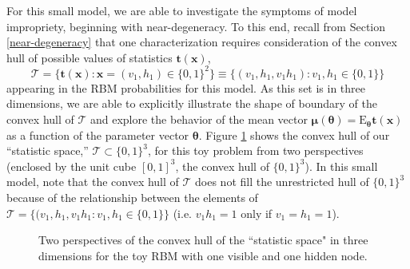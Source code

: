 \documentclass[AMS,STIX1COL]{WileyNJD-v2}
\begin{document}
For this small model, we are able to investigate the symptoms of model
impropriety, beginning with near-degeneracy. To this end, recall from
Section \ref{near-degeneracy} that one characterization requires
consideration of the convex hull of possible values of statistics
\(\boldsymbol t(\boldsymbol x)\), \[
\mathcal{T} = \{\boldsymbol t(\boldsymbol x): \boldsymbol x = (v_1, h_1) \in \{0,1\}^2\} \equiv \{(v_1, h_1, v_1 h_1): v_1, h_1 \in \{0,1\}\}
\] appearing in the RBM probabilities for this model. As this set is in
three dimensions, we are able to explicitly illustrate the shape of
boundary of the convex hull of \(\mathcal{T}\) and explore the behavior
of the mean vector
\(\boldsymbol \mu(\boldsymbol \theta) = \text{E}_{\boldsymbol \theta} \boldsymbol t(\boldsymbol x)\)
as a function of the parameter vector \(\boldsymbol \theta\). Figure
\ref{fig:toyhull} shows the convex hull of our ``statistic space,''
\(\mathcal{T} \subset \{0,1\}^3\), for this toy problem from two
perspectives (enclosed by the unit cube \([0,1]^3\), the convex hull of
\(\{0,1\}^3\)). In this small model, note that the convex hull of
\(\mathcal{T}\) does not fill the unrestricted hull of \(\{0,1\}^3\)
because of the relationship between the elements of
\(\mathcal{T} = \{(v_1, h_1, v_1 h_1 : v_1, h_1 \in \{0, 1\} \}\) (i.e.
\(v_1 h_1 = 1\) only if \(v_1 = h_1 = 1\)).

\par

\begin{figure}[ht]
  \begin{minipage}{0.45\textwidth}
  \end{minipage}
  \begin{minipage}{0.45\textwidth}
  \end{minipage}
  \caption{Two perspectives of the convex hull of the ``statistic space" in three dimensions for the toy RBM with one visible and one hidden node.}
\label{fig:toyhull}
\end{figure}
\end{document}
